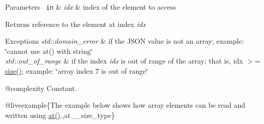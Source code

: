 \begin{DoxyParams}[1]{Parameters}
\mbox{\texttt{ in}}  & {\em idx} & index of the element to access\\
\hline
\end{DoxyParams}
\begin{DoxyReturn}{Returns}
reference to the element at index {\itshape idx} 
\end{DoxyReturn}

\begin{DoxyExceptions}{Exceptions}
{\em std\+::domain\+\_\+error} & if the J\+S\+ON value is not an array; example\+: {\ttfamily \char`\"{}cannot use at() with string\char`\"{}} \\
\hline
{\em std\+::out\+\_\+of\+\_\+range} & if the index {\itshape idx} is out of range of the array; that is, {\ttfamily idx $>$= \mbox{\hyperlink{classnlohmann_1_1basic__json_a25e27ad0c6d53c01871c5485e1f75b96}{size()}}}; example\+: {\ttfamily \char`\"{}array index 7 is out of range\char`\"{}}\\
\hline
\end{DoxyExceptions}
@complexity Constant.

@liveexample\{The example below shows how array elements can be read and written using {\ttfamily \mbox{\hyperlink{classnlohmann_1_1basic__json_a73ae333487310e3302135189ce8ff5d8}{at()}}}.,at\+\_\+\+\_\+size\+\_\+type\}

